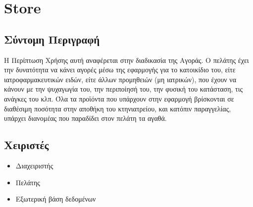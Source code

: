 \documentclass[12pt,a4paper,twoside]{book}
\begin{document}


\section{Store} %

\subsection{Σύντομη Περιγραφή}
Η Περίπτωση Χρήσης αυτή αναφέρεται στην διαδικασία της Αγοράς. Ο πελάτης έχει την δυνατότητα να κάνει αγορές μέσω της εφαρμογής για το κατοικίδιο του, είτε ιατροφαρμακευτικών ειδών, είτε άλλων προμηθειών (μη ιατρικών), που έχουν να κάνουν με την ψυχαγωγία του, την περιποίησή του, την φυσική του κατάσταση, τις ανάγκες του κλπ.  Όλα τα προϊόντα που υπάρχουν στην εφαρμογή βρίσκονται σε διαθέσιμη ποσότητα στην αποθήκη του κτηνιατρείου, και κατόπιν παραγγελίας, υπάρχει διανομέας που παραδίδει στον πελάτη τα αγαθά. %

\subsection{Χειριστές}
\begin{itemize}
  \item Διαχειριστής
  \item Πελάτης
  \item Εξωτερική βάση δεδομένων %
\end{itemize}
\end{document}
